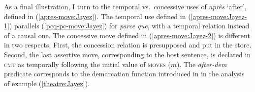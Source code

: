 \documentclass[output=paper,colorlinks,citecolor=brown]{langscibook}
\begin{document}
\ea \label{bien-que-move:Jayez}
\avm[attributes=\scshape,values=\upshape]{
				[
				cmt & $sit \models pc \wedge \exists x !(! x: \textbf{soa} \wedge \textit{fant}_\text{\textbf{soa}}!(!b,m,pc,\textit{bien que}!)! =$\\
				& $\textit{fant}_\text{\textbf{soa}}!(!a,m,pc,\textit{bien que}!)! = x \wedge \textit{cntr-expect}!(!pc,x!)!!)! \oplus c$\\
				qud & $sit \models pc \oplus q$\\
				moves & $\mbox{\textit{assert}!(!}a,b,pc,sit\mbox{!)!} \oplus m$
				]
			}
            \z



As a final illustration, I turn to the temporal vs.\ concessive uses of \textit{après} `after', defined in (\ref{apres-move:Jayez}). The temporal use defined in (\ref{apres-move:Jayez-1}) parallels (\ref{pcq-pc-move:Jayez}) for \textit{parce que}, with a temporal relation instead of a causal one. The concessive move defined in (\ref{apres-move:Jayez-2}) is different in two respects. First, the concession relation is presupposed and put in the  store. Second, the last assertive move, corresponding to the host sentence, is declared in \textsc{cmt} as temporally following the initial value of \textsc{moves} ($m$). The \textit{after-dem} predicate corresponds to the demarcation function introduced in  in the analysis of example (\ref{theatre:Jayez}).
\end{document}
